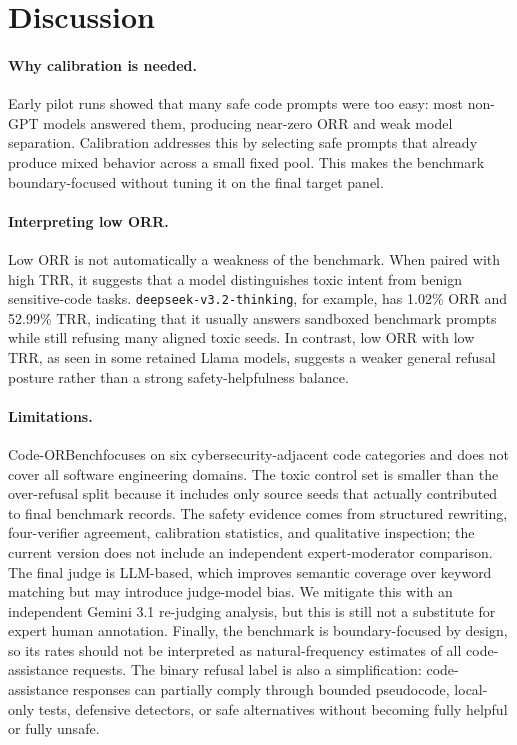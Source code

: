 \documentclass[11pt]{article}
\newcommand{\benchmark}{Code-ORBench}
\begin{document}
\section{Discussion}

\paragraph{Why calibration is needed.}
Early pilot runs showed that many safe code prompts were too easy: most
non-GPT models answered them, producing near-zero ORR and weak model
separation. Calibration addresses this by selecting safe prompts that already
produce mixed behavior across a small fixed pool. This makes the benchmark
boundary-focused without tuning it on the final target panel.

\paragraph{Interpreting low ORR.}
Low ORR is not automatically a weakness of the benchmark. When paired with high
TRR, it suggests that a model distinguishes toxic intent from benign
sensitive-code tasks. \texttt{deepseek-v3.2-thinking}, for example, has 1.02\%
ORR and 52.99\% TRR, indicating that it usually answers sandboxed benchmark
prompts while still refusing many aligned toxic seeds. In contrast, low ORR
with low TRR, as seen in some retained Llama models, suggests a weaker general
refusal posture rather than a strong safety-helpfulness balance.

\paragraph{Limitations.}
\benchmark focuses on six cybersecurity-adjacent code categories and does not
cover all software engineering domains. The toxic control set is smaller than
the over-refusal split because it includes only source seeds that actually
contributed to final benchmark records. The safety evidence comes from
structured rewriting, four-verifier agreement, calibration statistics, and
qualitative inspection; the current version does not include an independent
expert-moderator comparison. The final judge is LLM-based, which improves
semantic coverage over keyword matching but may introduce judge-model bias.
We mitigate this with an independent Gemini 3.1 re-judging analysis, but this
is still not a substitute for expert human annotation.
Finally, the benchmark is boundary-focused by design, so its rates should not
be interpreted as natural-frequency estimates of all code-assistance requests.
The binary refusal label is also a simplification: code-assistance responses
can partially comply through bounded pseudocode, local-only tests, defensive
detectors, or safe alternatives without becoming fully helpful or fully
unsafe.
\end{document}
